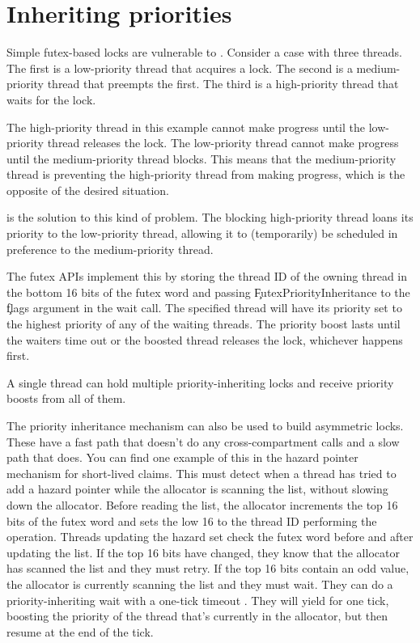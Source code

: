 \section[label=priority_inheritance]{Inheriting priorities}

Simple futex-based locks are vulnerable to .
Consider a case with three threads.
The first is a low-priority thread that acquires a lock.
The second is a medium-priority thread that preempts the first.
The third is a high-priority thread that waits for the lock.

The high-priority thread in this example cannot make progress until the low-priority thread releases the lock.
The low-priority thread cannot make progress until the medium-priority thread blocks.
This means that the medium-priority thread is preventing the high-priority thread from making progress, which is the opposite of the desired situation.

 is the solution to this kind of problem.
The blocking high-priority thread loans its priority to the low-priority thread, allowing it to (temporarily) be scheduled in preference to the medium-priority thread.

The futex APIs implement this by storing the thread ID of the owning thread in the bottom 16 bits of the futex word and passing \c{FutexPriorityInheritance} to the \c{flags} argument in the wait call.
The specified thread will have its priority set to the highest priority of any of the waiting threads.
The priority boost lasts until the waiters time out or the boosted thread releases the lock, whichever happens first.

A single thread can hold multiple priority-inheriting locks and receive priority boosts from all of them.

The priority inheritance mechanism can also be used to build asymmetric locks.
These have a fast path that doesn't do any cross-compartment calls and a slow path that does.
You can find one example of this in the hazard pointer mechanism for short-lived claims.
This must detect when a thread has tried to add a hazard pointer while the allocator is scanning the list, without slowing down the allocator.
Before reading the list, the allocator increments the top 16 bits of the futex word and sets the low 16 to the thread ID performing the operation.
Threads updating the hazard set check the futex word before and after updating the list.
If the top 16 bits have changed, they know that the allocator has scanned the list and they must retry.
If the top 16 bits contain an odd value, the allocator is currently scanning the list and they must wait.
They can do a priority-inheriting wait with a one-tick timeout .
They will yield for one tick, boosting the priority of the thread that's currently in the allocator, but then resume at the end of the tick.

